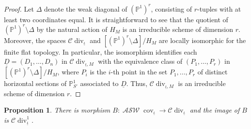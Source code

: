 \documentclass{compositio}
\newtheorem{proposition}[theorem]{Proposition}
\theoremstyle{remark}
\theoremstyle{remark}
\DeclareMathOperator{\cov}{cov}
\DeclareMathOperator{\divisor}{div}
\DeclareMathOperator{\ASW}{\mathcal{ASW}}
\begin{document}
\begin{proof}
Let $\Delta$ denote the weak diagonal of $(\mathbb{P}^1)^{r}$, consisting of $r$-tuples with at least two coordinates equal. It is straightforward to see that the quotient of $(\mathbb{P}^1)^{r} \setminus \Delta$ by the natural action of $H_M$ is an irreducible scheme of dimension $r$. Moreover, the spaces $\mathcal{C} \divisor_{\underline{\iota}}$ and $[(\mathbb{P}^1)^{r} \setminus \Delta]/H_M$ are locally isomorphic for the finite flat topology. In particular, the isomorphism identifies each $\underline{D}=(D_1, \ldots, D_n)$ in $\mathcal{C}\divisor_{\underline{\iota},M}$ with the equivalence class of $(P_1, \ldots, P_r)$ in $[(\mathbb{P}^1)^{r} \setminus \Delta]/H_M$, where $P_i$ is the $i$-th point in the set ${P_1, \ldots, P_r }$ of distinct horizontal sections of $\mathbb{P}^1_{S'}$ associated to $\underline{D}$. Thus, $\mathcal{C}\divisor_{\underline{\iota},M}$ is an irreducible scheme of dimension $r$.
\end{proof}



\begin{proposition}
\label{propthemapb}
There is morphism $B: \ASW\cov_{\underline{\iota}} \xrightarrow{} \mathcal{C}\divisor_{\underline{\iota}}$ and the image of $B$ is $\mathcal{C}\divisor^1_{\underline{\iota}}$.
\end{proposition}
\end{document}
